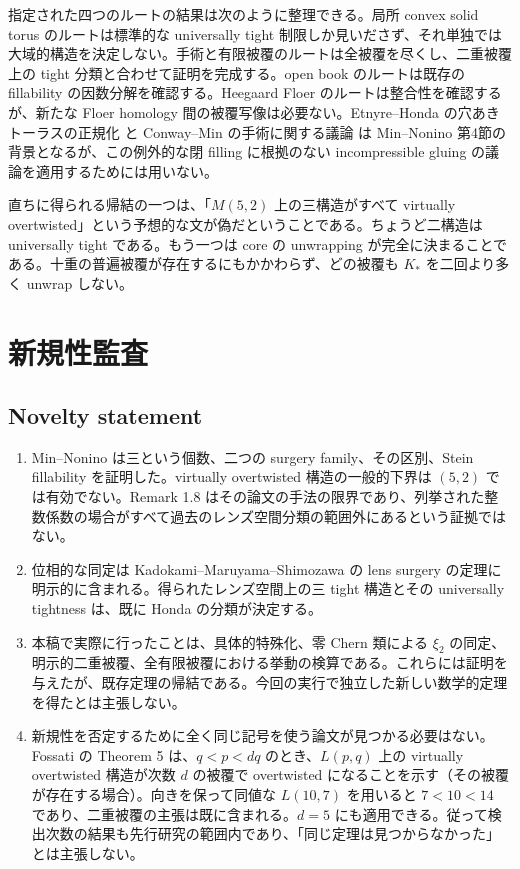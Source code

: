 \documentclass[12pt]{amsart}
\theoremstyle{definition}
\theoremstyle{remark}
\numberwithin{equation}{section}
\theoremstyle{definition}
\begin{document}
指定された四つのルートの結果は次のように整理できる。局所 convex solid torus のルートは標準的な universally tight 制限しか見いださず、それ単独では大域的構造を決定しない。手術と有限被覆のルートは全被覆を尽くし、二重被覆上の tight 分類と合わせて証明を完成する。open book のルートは既存の fillability の因数分解を確認する。Heegaard Floer のルートは整合性を確認するが、新たな Floer homology 間の被覆写像は必要ない。Etnyre--Honda の穴あきトーラスの正規化 \cite[Section 5.2, Proposition 5.5, Lemma 5.7]{ja-EH} と Conway--Min の手術に関する議論 \cite[Section 5.2]{ja-CM} は Min--Nonino 第4節の背景となるが、この例外的な閉 filling に根拠のない incompressible gluing の議論を適用するためには用いない。

直ちに得られる帰結の一つは、「$M(5,2)$ 上の三構造がすべて virtually overtwisted」という予想的な文が偽だということである。ちょうど二構造は universally tight である。もう一つは core の unwrapping が完全に決まることである。十重の普遍被覆が存在するにもかかわらず、どの被覆も $K_*$ を二回より多く unwrap しない。

\section{新規性監査}\label{ja-novelty}
\subsection{Novelty statement}
\begin{enumerate}
\item Min--Nonino は三という個数、二つの surgery family、その区別、Stein fillability を証明した。virtually overtwisted 構造の一般的下界は $(5,2)$ では有効でない。Remark 1.8 はその論文の手法の限界であり、列挙された整数係数の場合がすべて過去のレンズ空間分類の範囲外にあるという証拠ではない。
\item 位相的な同定は Kadokami--\allowbreak Maruyama--\allowbreak Shimozawa の lens surgery の定理に明示的に含まれる。得られたレンズ空間上の三 tight 構造とその universally tightness は、既に Honda の分類が決定する。
\item 本稿で実際に行ったことは、具体的特殊化、零 Chern 類による $\xi_2$ の同定、明示的二重被覆、全有限被覆における挙動の検算である。これらには証明を与えたが、既存定理の帰結である。今回の実行で独立した新しい数学的定理を得たとは主張しない。
\item 新規性を否定するために全く同じ記号を使う論文が見つかる必要はない。Fossati の Theorem 5 は、$q<p<dq$ のとき、$L(p,q)$ 上の virtually overtwisted 構造が次数 $d$ の被覆で overtwisted になることを示す（その被覆が存在する場合）。向きを保って同値な $L(10,7)$ を用いると $7<10<14$ であり、二重被覆の主張は既に含まれる。$d=5$ にも適用できる。従って検出次数の結果も先行研究の範囲内であり、「同じ定理は見つからなかった」とは主張しない。
\end{enumerate}
\end{document}
